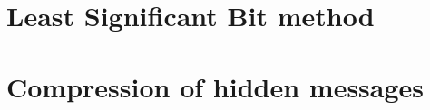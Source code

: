 

\section{Least Significant Bit method}
\label{LSB}


\section{Compression of hidden messages}
\label{Compression}
